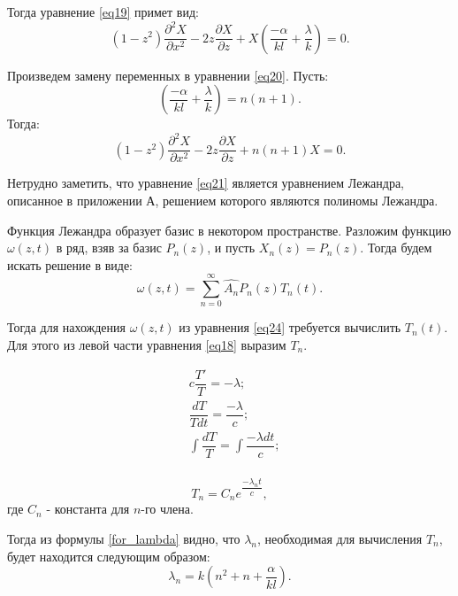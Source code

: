{Тогда уравнение \eqref{eq19} примет вид:
    \begin{equation}\label{eq20}
    (1-z^2)\dfrac{\partial^2 X}{\partial x^2} - 2z\dfrac{\partial X}{\partial z} +  X (\dfrac{-\alpha}{kl} + \dfrac{\lambda}{k}) = 0.
    \end{equation}
    
    Произведем замену переменных в уравнении \eqref{eq20}.
    Пусть: 
    \begin{equation}\label{for_lambda}
        (\dfrac{-\alpha}{kl} + \dfrac{\lambda}{k}) = n(n+1).
    \end{equation}
    Тогда:
    \begin{equation}\label{eq21}
    (1-z^2)\dfrac{\partial^2 X}{\partial x^2} - 2z\dfrac{\partial X}{\partial z} +  n(n+1)X = 0.
    \end{equation}
    
    Нетрудно заметить, что уравнение \eqref{eq21} является уравнением Лежандра, описанное в приложении А, решением которого являются полиномы Лежандра.
    
    Функция Лежандра образует базис в некотором пространстве. Разложим функцию $\omega(z,t)$ в ряд, взяв за базис $P_n(z)$, и  пусть $X_n(z) = P_n(z)$. Тогда будем искать решение в виде:
    \begin{equation}\label{eq24}
    \omega(z,t) = \sum_{n=0}^{\infty}{\hat{A_n} P_n(z) T_n(t)}.
    \end{equation}
    

    Тогда для нахождения $\omega(z, t)$ из уравнения \eqref{eq24} требуется вычислить $T_n(t)$. Для этого из левой части уравнения \eqref{eq18} выразим $T_n$.
    
    \begin{align*}
        &c\dfrac{T'}{T} = -\lambda;  \\
        &\dfrac{d T}{T d t} = \dfrac{- \lambda}{c};\\
        &\int\limits{\dfrac{d T}{T}} = \int\limits{\dfrac{- \lambda dt}{c}}; \\
    \end{align*}
    
    \begin{equation}\label{eq25}
        T_n = C_n e^{\dfrac{-\lambda_n t}{c}},
    \end{equation}        
    где $C_n$ - константа для $n$-го члена.
    
        Тогда из формулы \eqref{for_lambda} видно, что $\lambda_n$, необходимая для вычисления $T_n$, будет находится следующим образом:
    \begin{equation}\label{eq26}
        \lambda_n = k(n^2 + n + \dfrac{\alpha}{kl}).
    \end{equation}
    
}
